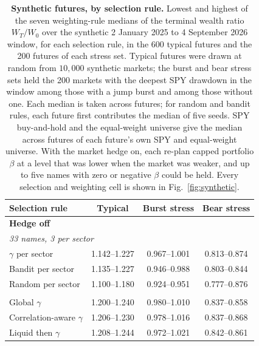 \begin{table}[H]
\centering
\small
\caption{\textbf{Synthetic futures, by selection rule.} Lowest and highest of the seven weighting-rule medians of
the terminal wealth ratio $W_T/W_0$ over the synthetic 2 January 2025 to 4 September 2026 window, for each selection
rule, in the 600 typical futures and the 200 futures of each stress set. Typical futures were drawn at random from
$10{,}000$ synthetic markets; the burst and bear stress sets held the 200 markets with the deepest SPY drawdown in the
window among those with a jump burst and among those without one. Each median is taken across futures; for
random and bandit rules, each future first contributes the median of five seeds. SPY buy-and-hold and the
equal-weight universe give the median across futures of each future's own SPY and equal-weight universe. 
With the market hedge on, each re-plan capped portfolio $\beta$ at a level that was lower when the market was weaker, and up to five names with zero or negative $\beta$ could be held. Every selection and weighting cell is shown in
Fig.~\ref{fig:synthetic}.}
\label{tab:synthetic}
\begin{tabular}{lccc}
\toprule
Selection rule & Typical & Burst stress & Bear stress \\
\midrule
\multicolumn{4}{l}{\textbf{Hedge off}} \\
\multicolumn{4}{l}{\emph{33 names, 3 per sector}} \\
$\gamma$ per sector & 1.142--1.227 & 0.967--1.001 & 0.813--0.874 \\
Bandit per sector & 1.135--1.227 & 0.946--0.988 & 0.803--0.844 \\
Random per sector & 1.100--1.180 & 0.924--0.951 & 0.777--0.876 \\
\addlinespace
\multicolumn{4}{l}{\emph{13 names}} \\
Global $\gamma$ & 1.200--1.240 & 0.980--1.010 & 0.837--0.858 \\
Correlation-aware $\gamma$ & 1.206--1.230 & 0.978--1.016 & 0.837--0.868 \\
Liquid then $\gamma$ & 1.208--1.244 & 0.972--1.021 & 0.842--0.861 \\

\end{tabular}
\end{table}
